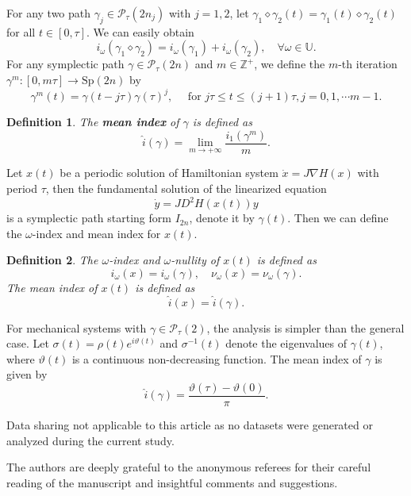 \documentclass[11pt]{amsart}
\newtheorem{defi}{Definition}[section]
\begin{document}
For any two path $\gamma_j\in\mathcal{P}_\tau(2n_j)$ with $j=1,2$, let $\gamma_1\diamond\gamma_2(t)=\gamma_1(t)\diamond\gamma_2(t)$ for all $t\in[0,\tau]$. We can easily obtain
$$i_\omega(\gamma_1\diamond\gamma_2)=i_\omega(\gamma_1)+i_\omega(\gamma_2),\quad \forall\omega\in\mathbb{U}.
$$
For any symplectic path $\gamma\in\mathcal{P}_\tau(2n)$ and $m\in\mathbb{Z}^+$, we define the $m$-th iteration $\gamma^m:[0,m\tau]\rightarrow\text{Sp}(2n)$ by
$$\gamma^m(t)=\gamma(t-j\tau)\gamma(\tau)^j,\quad\text{ for } j\tau\leq t\leq(j+1)\tau,j=0,1,\cdots m-1.
$$
\begin{defi}
	The \textbf{mean index} of $\gamma$ is defined as
	$$\hat{i}(\gamma)=\lim\limits_{m\rightarrow+\infty}\frac{i_1(\gamma^m)}{m}.
	$$
\end{defi}
Let $x(t)$ be a periodic solution of Hamiltonian system $\dot{x}=J\nabla H(x)$ with period $\tau$, then the fundamental solution of the linearized equation $$\dot{y}=JD^2H(x(t))y$$ is a symplectic path starting form $I_{2n}$, denote it by $\gamma(t)$. Then we can define the $\omega$-index and mean index for $x(t)$.
\begin{defi}
	The $\omega$-index and $\omega$-nullity of $x(t)$ is defined as
	$$i_\omega(x)=i_\omega(\gamma),\quad \nu_\omega(x)=\nu_\omega(\gamma).
	$$
	The mean index of $x(t)$ is defined as
	$$\hat{i}(x)=\hat{i}(\gamma).
	$$
\end{defi}
For mechanical systems with $\gamma\in\mathcal{P}_\tau(2)$, the analysis is simpler than the general case. Let $\sigma(t)=\rho(t)e^{i\vartheta(t)}$ and $\sigma^{-1}(t)$ denote the eigenvalues of $\gamma(t)$, where $\vartheta(t)$ is a continuous non-decreasing function. The mean index of $\gamma$ is given by  
$$
\hat{i}(\gamma) = \frac{\vartheta(\tau) - \vartheta(0)}{\pi}.  
$$


\hfill\newline
{} Data sharing not applicable to this article as no datasets were generated or analyzed during the current study.


\hfill\newline
{} 
The authors are deeply grateful to the anonymous referees for their careful reading of the manuscript and insightful comments and suggestions.


\hfill\newline

%




	
\end{document}
